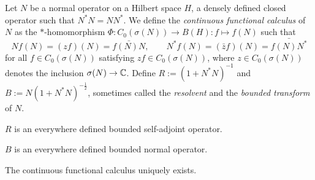 \documentclass{../../large}
\begin{document}
\begin{prb}
Let $N$ be a normal operator on a Hilbert space $H$, a densely defined closed operator such that $N^*N=NN^*$.
We define the \emph{continuous functional calculus} of $N$ as the $*$-homomorphism $\Phi:C_0(\sigma(N))\to B(H):f\mapsto f(N)$ such that
\[Nf(N)=(zf)(N)=\bar{f(N)N},\qquad N^*f(N)=(\bar zf)(N)=\bar{f(N)N^*}\]
for all $f\in C_0(\sigma(N))$ satisfying $zf\in C_0(\sigma(N))$, where $z\in C_0(\sigma(N))$ denotes the inclusion $\sigma(N)\to\mathbb{C}$.
Define $R:=(1+N^*N)^{-1}$ and $B:=N(1+N^*N)^{-\frac12}$, sometimes called the \emph{resolvent} and the \emph{bounded transform} of $N$.
\begin{parts}
\item $R$ is an everywhere defined bounded self-adjoint operator.
\item $B$ is an everywhere defined bounded normal operator.
\item The continuous functional calculus uniquely exists.
\end{parts}
\end{prb}
\end{document}
